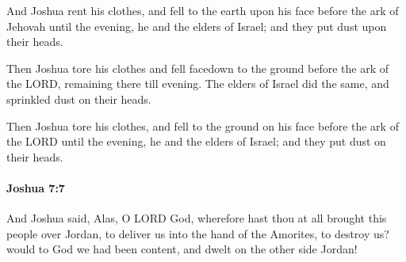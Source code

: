 			\begin{versebox}
					\item[BHS] 
					\item[ASV] And Joshua rent his clothes, and fell to the earth upon his face before the ark of Jehovah until the evening, he and the elders of Israel; and they put dust upon their heads.
					\item[NIV] Then Joshua tore his clothes and fell facedown to the ground before the ark of the LORD, remaining there till evening. The elders of Israel did the same, and sprinkled dust on their heads.
					\item[NRSV] Then Joshua tore his clothes, and fell to the ground on his face before the ark of the LORD until the evening, he and the elders of Israel; and they put dust on their heads.
			\end{versebox}

		\paragraph{Joshua 7:7} %
			\label{JOSHUA-7-7}

			And Joshua said, Alas, O LORD God, wherefore hast thou at all brought this people over Jordan, to deliver us into the hand of the Amorites, to destroy us? would to God we had been content, and dwelt on the other side Jordan!

